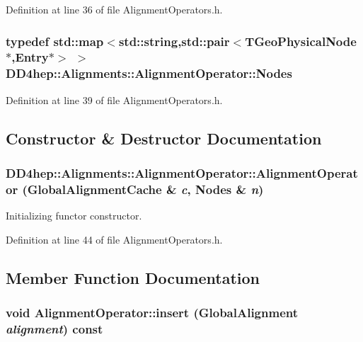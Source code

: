 Definition at line 36 of file AlignmentOperators.h.\hypertarget{class_d_d4hep_1_1_alignments_1_1_alignment_operator_a2f25eae1d38abc30a09f7a840ab0662a}{
\subsubsection[{Nodes}]{\setlength{\rightskip}{0pt plus 5cm}typedef std::map$<$std::string,std::pair$<$TGeoPhysicalNode$\ast$,{\bf Entry}$\ast$$>$ $>$ {\bf DD4hep::Alignments::AlignmentOperator::Nodes}}}
\label{class_d_d4hep_1_1_alignments_1_1_alignment_operator_a2f25eae1d38abc30a09f7a840ab0662a}


Definition at line 39 of file AlignmentOperators.h.

\subsection{Constructor \& Destructor Documentation}
\hypertarget{class_d_d4hep_1_1_alignments_1_1_alignment_operator_a46730d86c085b06213e2d18714df0c02}{
\subsubsection[{AlignmentOperator}]{\setlength{\rightskip}{0pt plus 5cm}DD4hep::Alignments::AlignmentOperator::AlignmentOperator ({\bf GlobalAlignmentCache} \& {\em c}, \/  {\bf Nodes} \& {\em n})}}
\label{class_d_d4hep_1_1_alignments_1_1_alignment_operator_a46730d86c085b06213e2d18714df0c02}


Initializing functor constructor. 

Definition at line 44 of file AlignmentOperators.h.

\subsection{Member Function Documentation}
\hypertarget{class_d_d4hep_1_1_alignments_1_1_alignment_operator_ad23641b687f526eb9ad3984dfc289e61}{
\subsubsection[{insert}]{\setlength{\rightskip}{0pt plus 5cm}void AlignmentOperator::insert ({\bf GlobalAlignment} {\em alignment}) const}}
\label{class_d_d4hep_1_1_alignments_1_1_alignment_operator_ad23641b687f526eb9ad3984dfc289e61}



